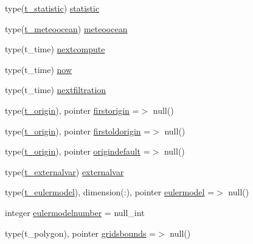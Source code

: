 \begin{DoxyCompactItemize}
\item 
type(\mbox{\hyperlink{structmodulelagrangianglobal_1_1t__statistic}{t\+\_\+statistic}}) \mbox{\hyperlink{structmodulelagrangianglobal_1_1t__lagrangian_a4e86410968fe279c55e1be7726136619}{statistic}}
\item 
type(\mbox{\hyperlink{structmodulelagrangianglobal_1_1t__meteoocean}{t\+\_\+meteoocean}}) \mbox{\hyperlink{structmodulelagrangianglobal_1_1t__lagrangian_a235c5b083e2ecddda86ca5fa1cf30803}{meteoocean}}
\item 
type(t\+\_\+time) \mbox{\hyperlink{structmodulelagrangianglobal_1_1t__lagrangian_a4710878ba09f7c24303a64045365f538}{nextcompute}}
\item 
type(t\+\_\+time) \mbox{\hyperlink{structmodulelagrangianglobal_1_1t__lagrangian_a1877c074cd723495f6175ab9ad78a561}{now}}
\item 
type(t\+\_\+time) \mbox{\hyperlink{structmodulelagrangianglobal_1_1t__lagrangian_a4ee30e646ff3c6ae53b2026caeb8a81e}{nextfiltration}}
\item 
type(\mbox{\hyperlink{structmodulelagrangianglobal_1_1t__origin}{t\+\_\+origin}}), pointer \mbox{\hyperlink{structmodulelagrangianglobal_1_1t__lagrangian_ad456b26bc065ff82d8c1d281ec7dfe6c}{firstorigin}} =$>$ null()
\item 
type(\mbox{\hyperlink{structmodulelagrangianglobal_1_1t__origin}{t\+\_\+origin}}), pointer \mbox{\hyperlink{structmodulelagrangianglobal_1_1t__lagrangian_addbbc7e186667039f8fca365af1fb951}{firstoldorigin}} =$>$ null()
\item 
type(\mbox{\hyperlink{structmodulelagrangianglobal_1_1t__origin}{t\+\_\+origin}}), pointer \mbox{\hyperlink{structmodulelagrangianglobal_1_1t__lagrangian_a9997fcec4a568376b1cffb6cece7e3c5}{origindefault}} =$>$ null()
\item 
type(\mbox{\hyperlink{structmodulelagrangianglobal_1_1t__externalvar}{t\+\_\+externalvar}}) \mbox{\hyperlink{structmodulelagrangianglobal_1_1t__lagrangian_ad9cd07c3e297d0135dccbdff7fab3455}{externalvar}}
\item 
type(\mbox{\hyperlink{structmodulelagrangianglobal_1_1t__eulermodel}{t\+\_\+eulermodel}}), dimension(\+:), pointer \mbox{\hyperlink{structmodulelagrangianglobal_1_1t__lagrangian_a4b9c2940736f82f4da73dfb84c490a52}{eulermodel}} =$>$ null()
\item 
integer \mbox{\hyperlink{structmodulelagrangianglobal_1_1t__lagrangian_ab6b3cdde8a8fef1b6ea219e0d509f836}{eulermodelnumber}} = null\+\_\+int
\item 
type(t\+\_\+polygon), pointer \mbox{\hyperlink{structmodulelagrangianglobal_1_1t__lagrangian_a100a4e1067e5644cd3425b24d9f4c280}{gridsbounds}} =$>$ null()

\end{DoxyCompactItemize}
